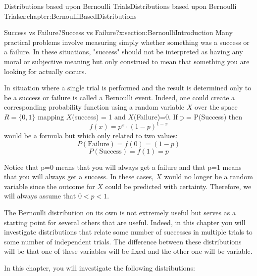 \documentclass[oneside,10pt,]{book}
\numberwithin{equation}{section}
\begin{document}
\begin{chapterptx}{Distributions based upon Bernoulli Trials}{}{Distributions based upon Bernoulli Trials}{}{}{x:chapter:BernoulliBasedDistributions}
%
%
\typeout{************************************************}
\typeout{************************************************}
%
\begin{sectionptx}{Success vs Failure?}{}{Success vs Failure?}{}{}{x:section:BernoulliIntroduction}
Many practical problems involve measuring simply whether something was a success or a failure. In these situations, "success" should not be interpreted as having any moral or subjective meaning but only construed to mean that something you are looking for actually occurs.%
\par
In situation where a single trial is performed and the result is determined only to be a success or failure is called a Bernoulli event. Indeed, one could create a corresponding probability function using a random variable \(X\) over the space \(R = \{0, 1 \}\) mapping \(X\)(success) = 1 and \(X\)(Failure)=0. If p = P(Success) then%
\begin{equation*}
f(x) = p^x \cdot (1-p)^{1-x}
\end{equation*}
would be a formula but which only related to two values:%
\begin{equation*}
P(\text{Failure}) = f(0) = (1-p)
\end{equation*}
%
\begin{equation*}
P(\text{Success}) = f(1) = p
\end{equation*}
%
\par
Notice that p=0 means that you will always get a failure and that p=1 means that you will always get a success. In these cases, \(X\) would no longer be a random variable since the outcome for \(X\) could be predicted with certainty. Therefore, we will always assume that \(0 < p < 1\).%
\par
The Bernoulli distribution on its own is not extremely useful but serves as a starting point for several others that are useful.  Indeed, in this chapter you will investigate distributions that relate some number of successes in multiple trials to some number of independent trials. The difference between these distributions will be that one of these variables will be fixed and the other one will be variable.%
\par
In this chapter, you will investigate the following distributions:%
\begin{enumerate}

\end{enumerate}
\end{sectionptx}
\end{chapterptx}
\end{document}
